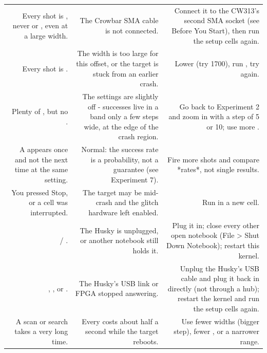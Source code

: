 \documentclass[11pt,letterpaper]{article}
\begin{document}
{\small{}
\begin{longtable}{|R{0.2754}|R{0.3043}|R{0.4203}|}
\hline
{} &  &  \\ \hline
\endhead
Every shot is , never  or , even at a large width. & The Crowbar SMA cable is not connected. & Connect it to the CW313's second SMA socket (see Before You Start), then run the setup cells again. \\ \hline
Every shot is . & The width is too large for this offset, or the target is stuck from an earlier crash. & Lower  (try 1700), run , try again. \\ \hline
Plenty of , but no . & The settings are slightly off - successes live in a band only a few steps wide, at the edge of the crash region. & Go back to Experiment 2 and zoom in with a step of 5 or 10; use more . \\ \hline
A  appears once and not the next time at the same setting. & Normal: the success rate is a probability, not a guarantee (see Experiment 7). & Fire more shots and compare *rates*, not single results. \\ \hline
You pressed Stop, or a cell was interrupted. & The target may be mid-crash and the glitch hardware left enabled. & Run  in a new cell. \\ \hline
{} / . & The Husky is unplugged, or another notebook still holds it. & Plug it in; close every other open notebook (File \textgreater{} Shut Down Notebook); restart this kernel. \\ \hline
{}, , or . & The Husky's USB link or FPGA stopped answering. & Unplug the Husky's USB cable and plug it back in directly (not through a hub); restart the kernel and run the setup cells again. \\ \hline
A scan or search takes a very long time. & Every  costs about half a second while the target reboots. & Use fewer widths (bigger step), fewer , or a narrower range. \\ \hline
\end{longtable}}
\end{document}
